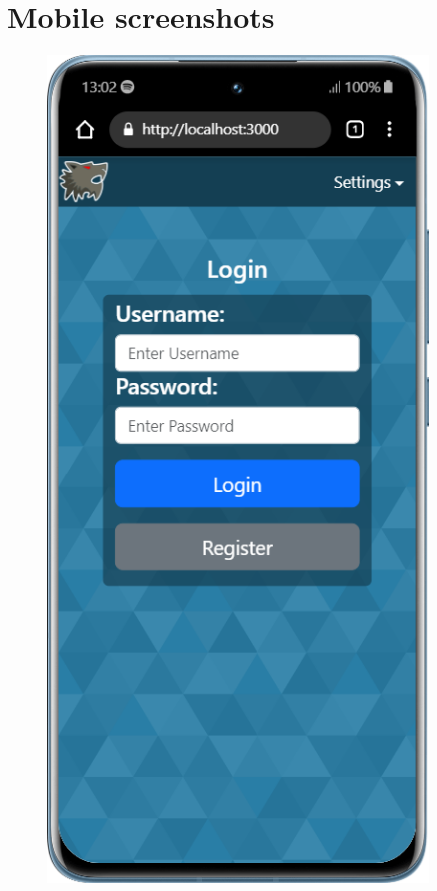 
\chapter{Mobile screenshots}\label{appendix:mobile}


\begin{figure}[H]
    \centering
    \begin{minipage}{0.45\textwidth}
        \centering
        \includegraphics[width=0.9\textwidth]{img/screen/mobile/login_mobile.png}

\end{minipage}
\end{figure}
